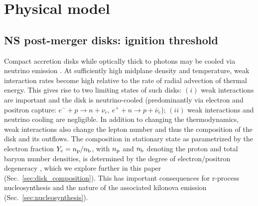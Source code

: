 

\section{Physical model}

\subsection{NS post-merger disks: ignition threshold}
\label{sec:intro_ignition_threshold}

Compact accretion disks while optically thick to photons may be cooled via neutrino emission %
\cite{popham_hyperaccreting_1999,narayan_accretion_2001-1,di_matteo_neutrino_2002,beloborodov_nuclear_2003,kohri_neutrino-dominated_2005,chen_neutrino-cooled_2007,kawanaka_neutrino-cooled_2007}. At sufficiently high midplane density and temperature, weak interaction rates become high relative to the rate of radial advection of thermal energy. This gives rise to two limiting states of such disks: $(i)$ weak interactions are important and the disk is neutrino-cooled (predominantly via electron and positron capture: $e^- + p \rightarrow n + \nu_e$, $e^+ + n \rightarrow p + \bar{\nu}_e$); $(ii)$ weak interactions and neutrino cooling are negligible. In addition to changing the thermodynamics, weak interactions also change the lepton number and thus the composition of the disk and its outflows. The composition in stationary state as parametrized by the electron fraction $Y_e= n_{\rm p}/n_{\rm b}$, with $n_{\rm p}$ and $n_{\rm b}$ denoting the proton and total baryon number densities, is determined by the degree of electron/positron degeneracy \cite{beloborodov_nuclear_2003,chen_neutrino-cooled_2007,siegel_three-dimensional_2017,siegel_three-dimensional_2018}, which we explore further in this paper (Sec.~\ref{sec:disk_composition}). This has important consequences for r-process nucleosynthesis and the nature of the associated kilonova emission (Sec.~\ref{sec:nucleosynthesis}).

